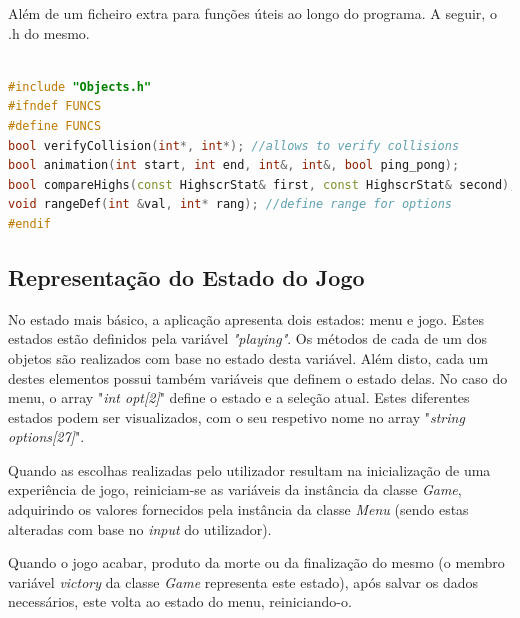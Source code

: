 \documentclass[a4paper,11pt]{article}
\newcommand\tab[1][0.8cm]{\hspace*{#1}}
\begin{document}
\vspace{8pt}

Além de um ficheiro extra para funções úteis ao longo do programa. A seguir, o .h do mesmo.

\begin{lstlisting}[language = C++]

#include "Objects.h"
#ifndef FUNCS
#define FUNCS
bool verifyCollision(int*, int*); //allows to verify collisions
bool animation(int start, int end, int&, int&, bool ping_pong);
bool compareHighs(const HighscrStat& first, const HighscrStat& second);
void rangeDef(int &val, int* rang); //define range for options
#endif

\end{lstlisting}

\vspace{8pt}

\subsection{Representação do Estado do Jogo}

\vspace{8pt}

\tab No estado mais básico, a aplicação apresenta dois estados: menu e jogo. Estes estados estão definidos pela variável \textit{"playing"}. Os métodos de cada de um dos objetos são realizados com base no estado desta variável. Além disto, cada um destes elementos possui também variáveis que definem o estado delas. No caso do menu, o array "\textit{int opt[2]}" define o estado e a seleção atual. Estes diferentes estados podem ser visualizados, com o seu respetivo nome no array  "\textit{string options[27]}".

\vspace{8pt}

Quando as escolhas realizadas pelo utilizador resultam na inicialização de uma experiência de jogo, reiniciam-se as variáveis da instância da classe \textit{Game}, adquirindo os valores fornecidos pela instância da classe \textit{Menu} (sendo estas alteradas com base no \textit{input} do utilizador).

\vspace{8pt}

Quando o jogo acabar, produto da morte ou da finalização do mesmo (o membro variável \textit{victory} da classe \textit{Game} representa este estado), após salvar os dados necessários, este volta ao estado do menu, reiniciando-o.

\vspace{8pt}
\end{document}
